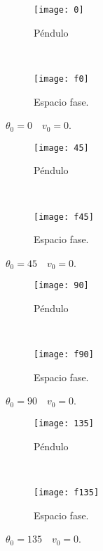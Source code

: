 \documentclass[12pt]{article}
\begin{document}
\begin{figure}[H]
    \centering
    \begin{subfigure}[b]{0.4\textwidth}
    \centering
        \texttt{[image: 0]}
        \caption{Péndulo}
    \end{subfigure}
    ~ 
    \begin{subfigure}[b]{0.4\textwidth}
    \centering
        \texttt{[image: f0]}
        \caption{Espacio fase.}
    \end{subfigure}
    \caption{$\theta_0=0 \quad v_0=0$.}
\end{figure}

\begin{figure}[H]
    \centering
    \begin{subfigure}[b]{0.4\textwidth}
    \centering
        \texttt{[image: 45]}
        \caption{Péndulo}
    \end{subfigure}
    ~ 
    \begin{subfigure}[b]{0.4\textwidth}
    \centering
        \texttt{[image: f45]}
        \caption{Espacio fase.}
    \end{subfigure}
    \caption{$\theta_0=45 \quad v_0=0$.}
\end{figure}

\begin{figure}[H]
    \centering
    \begin{subfigure}[b]{0.4\textwidth}
    \centering
        \texttt{[image: 90]}
        \caption{Péndulo}
    \end{subfigure}
    ~ 
    \begin{subfigure}[b]{0.4\textwidth}
    \centering
        \texttt{[image: f90]}
        \caption{Espacio fase.}
    \end{subfigure}
    \caption{$\theta_0=90 \quad v_0=0$.}
\end{figure}

\begin{figure}[H]
    \centering
    \begin{subfigure}[b]{0.4\textwidth}
    \centering
        \texttt{[image: 135]}
        \caption{Péndulo}
    \end{subfigure}
    ~ 
    \begin{subfigure}[b]{0.4\textwidth}
    \centering
        \texttt{[image: f135]}
        \caption{Espacio fase.}
    \end{subfigure}
    \caption{$\theta_0=135 \quad v_0=0$.}
\end{figure}
\end{document}
